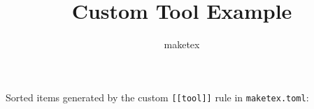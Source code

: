 \documentclass{article}
\title{Custom Tool Example}
\author{maketex}
\begin{document}
\maketitle

Sorted items generated by the custom \texttt{[[tool]]} rule in
\texttt{maketex.toml}:

\end{document}
